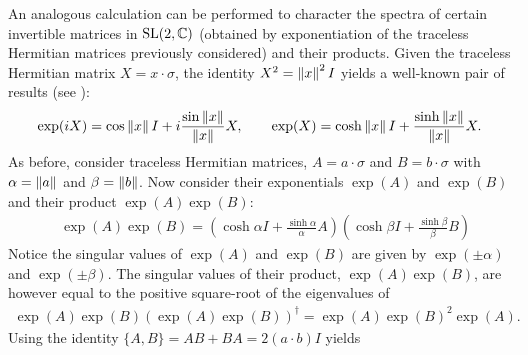 \documentclass[notitlepage, 10pt]{article}
\begin{document}
An analogous calculation can be performed to character the spectra of certain invertible matrices in $\operatorname{SL}(2, \mathbb C)$ (obtained by exponentiation of the traceless Hermitian matrices previously considered) and their products.
Given the traceless Hermitian matrix $X = x \cdot \sigma$, the identity $X^2 = \left\lVert x\right\rVert^{2} I$ yields a well-known pair of results (see \cite{forrester2014golden}):
\begin{equation}
    \exp(iX) = \cos \left\lVert x\right\rVert I + i\frac{\sin \left\lVert x\right\rVert}{\left\lVert x\right\rVert} X, \qquad 
    \exp(X) = \cosh \left\lVert x\right\rVert I + \frac{\sinh \left\lVert x\right\rVert}{\left\lVert x\right\rVert} X.
\end{equation}
As before, consider traceless Hermitian matrices, $A = a \cdot \sigma$ and $B = b \cdot \sigma$ with $\alpha = \left\lVert a\right\rVert$ and $\beta = \left\lVert b\right\rVert$.
Now consider their exponentials $\exp(A)$ and $\exp(B)$ and their product $\exp(A)\exp(B)$:
\begin{align}
    &\exp(A)\exp(B) 
    = \left(\cosh \alpha I + \frac{\sinh \alpha}{\alpha} A\right)\left(\cosh \beta I + \frac{\sinh \beta}{\beta} B\right)
\end{align}
Notice the singular values of $\exp(A)$ and $\exp(B)$ are given by $\exp(\pm \alpha)$ and $\exp(\pm \beta)$.
The singular values of their product, $\exp(A)\exp(B)$, are however equal to the positive square-root of the eigenvalues of
\begin{align}
    \exp(A)\exp(B)(\exp(A)\exp(B))^{\dagger} = \exp(A)\exp(B)^2\exp(A).
\end{align}
Using the identity $\{A,B\} = AB+BA = 2 (a \cdot b) I$ yields
\end{document}
